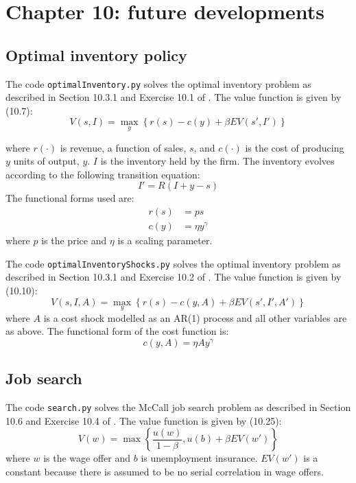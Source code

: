 \section{Chapter 10: future developments}

\subsection{Optimal inventory policy}

The code \texttt{optimalInventory.py} solves the optimal inventory problem as described in Section 10.3.1 and Exercise 10.1 of \citet{adda2003dynamic}. The value function is given by (10.7):
%
\begin{equation}
	V(s, I) = \max_{y} \left\{ r(s) - c(y) + \beta EV(s', I') \right\}
\end{equation}
%

where \(r(\cdot)\) is revenue, a function of sales, \(s\), and \(c(\cdot)\) is the cost of producing \(y\) units of output, \(y\). \(I\) is the inventory held by the firm. The inventory evolves according to the following transition equation:
%
\begin{equation}
	I' = R(I + y - s)
\end{equation}
%
The functional forms used are:
%
\begin{align}
 r(s) &=  ps \\
 c(y) &= \eta y^{\gamma}
\end{align}
%
where \(p\) is the price and \(\eta\) is a scaling parameter.

The code \texttt{optimalInventoryShocks.py} solves the optimal inventory problem as described in Section 10.3.1 and Exercise 10.2 of \citet{adda2003dynamic}. The value function is given by (10.10):
%
\begin{equation}
	V(s, I, A) = \max_{y} \left\{ r(s) - c(y, A) + \beta EV(s', I', A') \right\}
\end{equation}
%
where \(A\) is a cost shock modelled as an AR(1) process and all other variables are as above. The functional form of the cost function is:
%
\begin{equation}
 c(y, A) = \eta A y^{\gamma}
\end{equation}
%

\subsection{Job search}

The code \texttt{search.py} solves the McCall job search problem as described in Section 10.6 and Exercise 10.4 of \citet{adda2003dynamic}. The value function is given by (10.25):
%
\begin{equation}
	V(w) = \max \left\{ \frac{u(w)}{1-\beta}, u(b) + \beta EV(w') \right\}
\end{equation}
%
where \(w\) is the wage offer and \(b\) is unemployment insurance. \(EV(w')\) is a constant because there is assumed to be no serial correlation in wage offers.